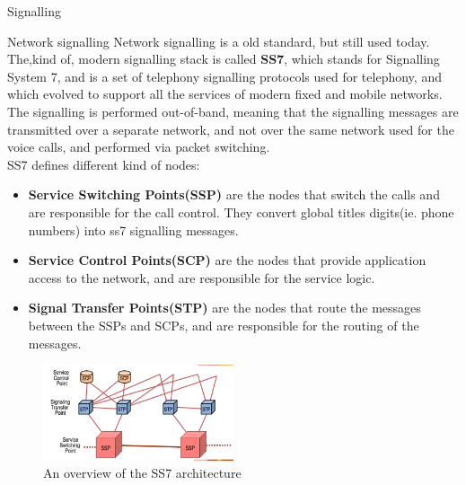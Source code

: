\begin{section}{Signalling}
  \begin{subsection}{Network signalling}
    Network signalling is a old standard, but still used today. The,kind of, modern signalling stack
    is called \textbf{SS7}, which stands for Signalling System 7, and is a set of telephony
    signalling protocols used for telephony, and which evolved to support all the services of modern
    fixed and mobile networks.\\
    The signalling is performed out-of-band, meaning that the signalling messages are transmitted
    over a separate network, and not over the same network used for the voice calls, and performed
    via packet switching.\\
    SS7 defines different kind of nodes:
    \begin{itemize}
      \item \textbf{Service Switching Points(SSP)} are the nodes that switch the calls and are
        responsible for the call control. They convert global titles digits(ie. phone numbers) into
        ss7 signalling messages.
      \item \textbf{Service Control Points(SCP)} are the nodes that provide application access to
        the network, and are responsible for the service logic.
      \item \textbf{Signal Transfer Points(STP)} are the nodes that route the messages between the
        SSPs and SCPs, and are responsible for the routing of the messages.
    \end{itemize}

    \begin{figure}[h]
      \centering
      \includegraphics[width=0.5\textwidth]{img/wireless/ss7 architecture.png}
      \caption{An overview of the SS7 architecture}
      \label{fig:ss7}
    \end{figure}


\end{subsection}
\end{section}
